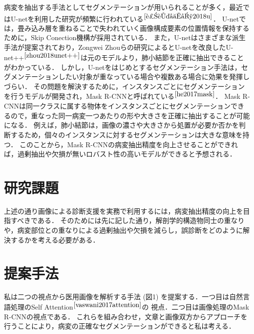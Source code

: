 \documentclass[a4j,10pt,twocolumn]{jarticle}
\begin{document}
病変を抽出する手法としてセグメンテーションが用いられることが多く，最近ではU-netを利用した研究が頻繁に行われている{$^{\cite{近藤堅司2018u}}$}．
U-netでは，畳み込み層を重ねることで失われていく画像構成要素の位置情報を保持するために，Skip Conection機構が採用されている．
また，U-netはさまざまな派生手法が提案されており，Zongwei Zhouらの研究によるとU-netを改良したU-net++{$^{\cite{zhou2018unet++}}$}は元のモデルより，肺小結節を正確に抽出できることがわかっている．
しかし，U-netをはじめとするセグメンテーション手法は，セグメンテーションしたい対象が重なっている場合や複数ある場合に効果を発揮しづらい．
その問題を解決するために，インスタンスごとにセグメンテーションを行うモデルが開発され，Mask R-CNNと呼ばれている{$^{\cite{he2017mask}}$}．
Mask R-CNNは同一クラスに属する物体をインスタンスごとにセグメンテーションできるので，重なった同一病変一つあたりの形や大きさを正確に抽出することが可能になる．
例えば，肺小結節は，画像の濃さや大きさから処置が必要か否かを判断するため，個々のインスタンスに対するセグメンテーションは大きな意味を持つ．
このことから，Mask R-CNNの病変抽出精度を向上させることができれば，過剰抽出や欠損が無いロバスト性の高いモデルができると予想される．

\section{研究課題}
上述の通り画像による診断支援を実務で利用するには，病変抽出精度の向上を目指すべきである．
そのためには先に記した通り，解剖学的構造物同士の重なりや，病変部位との重なりによる過剰抽出や欠損を減らし，誤診断をどのように解決するかを考える必要がある．


\section{提案手法}
私は二つの視点から医用画像を解析する手法 (図1) を提案する．一つ目は自然言語処理のSelf Attention{$^{\cite{vaswani2017attention}}$}の
視点．二つ目は画像処理のMask R-CNNの視点である．
これらを組み合わせ，文章と画像双方からアプローチを行うことにより，病変の正確なセグメンテーションができると私は考える．
\end{document}
